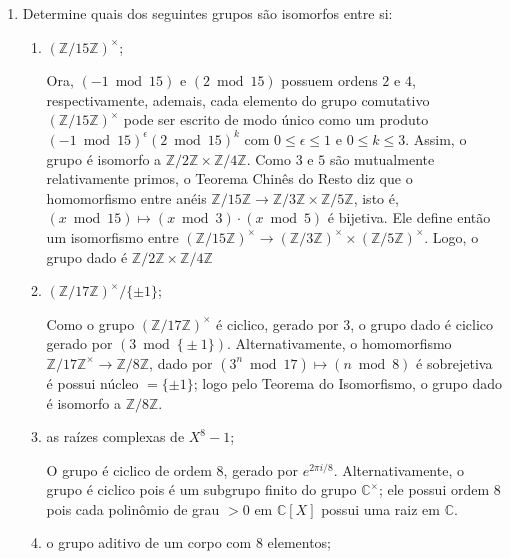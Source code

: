 \begin{exemplo}
\begin{enumerate}[left=0.5cm, align=left, nosep]
        \item Determine quais dos seguintes grupos são isomorfos entre si:
        \begin{enumerate}[label=(\alph*), left=0.5cm, align=left, nosep]
            \item $(\mathbb{Z}/15\mathbb{Z})^\times$;
        
            Ora, $(-1 \bmod 15)$ e $(2 \bmod 15)$ possuem ordens $2$ e $4$, respectivamente, ademais, cada elemento do grupo 
            comutativo $(\mathbb{Z}/15\mathbb{Z})^\times$ pode ser escrito de modo único como um produto $(-1 \bmod 15)^\epsilon 
            (2 \bmod 15)^k$ com $0 \leq \epsilon \leq 1$ e $0 \leq k \leq 3$. Assim, o grupo é isomorfo a $\mathbb{Z}/2\mathbb{Z} 
            \times \mathbb{Z}/4\mathbb{Z}$. Como $3$ e $5$ são mutualmente relativamente primos, o Teorema Chinês do Resto diz que 
            o homomorfismo entre anéis $\mathbb{Z}/15\mathbb{Z} \to \mathbb{Z}/3\mathbb{Z} \times \mathbb{Z}/5\mathbb{Z}$, isto é, 
            $(x \bmod 15) \mapsto (x \bmod 3) \cdot (x \bmod 5)$ é bijetiva. Ele define então um isomorfismo entre 
            $(\mathbb{Z}/15\mathbb{Z})^\times \to (\mathbb{Z}/3\mathbb{Z})^\times \times (\mathbb{Z}/5\mathbb{Z})^\times$. Logo, o 
            grupo dado é $\mathbb{Z}/2\mathbb{Z} \times \mathbb{Z}/4\mathbb{Z}$
            
            \item $(\mathbb{Z}/17\mathbb{Z})^\times / \{\pm 1\}$;
            
            Como o grupo $(\mathbb{Z}/17\mathbb{Z})^\times$ é ciclico, gerado por $3$, o grupo dado é ciclico gerado por 
            $(3 \bmod \{\pm 1\})$. Alternativamente, o homomorfismo $\mathbb{Z}/17\mathbb{Z}^\times \to \mathbb{Z}/8\mathbb{Z}$, 
            dado por $(3^n \bmod 17) \mapsto (n \bmod 8)$ é sobrejetiva é possui núcleo $= \{\pm 1\}$; logo pelo Teorema do Isomorfismo,
            o grupo dado é isomorfo a $\mathbb{Z}/8\mathbb{Z}$.
            
            \item as raízes complexas de $X^8 - 1$;
            
            O grupo é ciclico de ordem $8$, gerado por $e^{2\pi i/8}$. Alternativamente, o grupo é ciclico pois é um subgrupo finito 
            do grupo $\mathbb{C}^\times$; ele possui ordem $8$ pois cada polinômio de grau $> 0$ em $\mathbb{C}[X]$ possui uma raiz em 
            $\mathbb{C}$.
            
            \item o grupo aditivo de um corpo com $8$ elementos;
            

\end{enumerate}
\end{enumerate}
\end{exemplo}
